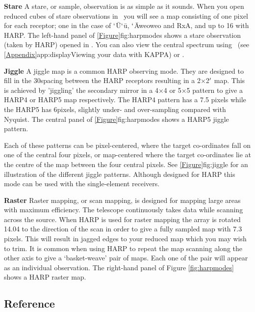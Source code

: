 \documentclass[11pt,oneside,chapters]{starlink}
\newcommand{\udeg}{\hspace{-0.3em}\dgs\hspace{-0.08em}}
\newcommand{\uarcs}{\hspace{-0.27em}\arcsec\hspace{-0.07em}}
\newcommand{\udeg}{\HCode{&deg}}
\newcommand{\uarcs}{$''$}
\begin{document}
\begin{aligndesc}
\item[\textbf{Stare}]
A stare, or sample, observation is as simple as it sounds. When you
open reduced cubes of stare observations in \gaia\ you will see a map
consisting of one pixel for each receptor; one in the case of
$`$\=U$`$\=u, $`$\=Aweoweo and RxA, and up to 16 with HARP.
The left-hand panel of \cref{Figure}{fig:harpmodes}{}
shows a stare observation (taken by HARP) opened in \gaia. You can also view the
central spectrum using \linplot\ (see \cref{Appendix}{app:display}{Viewing
your data with KAPPA}) or \splat.

\item[\textbf{Jiggle}]
A jiggle map is a common HARP observing mode. They are designed to
fill in the 30\arcsec spacing between the HARP receptors resulting in a
2\arcm$\times$2$\arcm$ map. This is achieved by 'jiggling' the secondary
mirror in a 4$\times$4 or 5$\times$5 pattern to give a HARP4 or HARP5
map respectively.  The HARP4 pattern has a 7.\uarcs5 pixels while the
HARP5 has 6\arcsec pixels, slightly under- and over-sampling compared
with Nyquist. The central panel of \cref{Figure}{fig:harpmodes}{} shows a
HARP5 jiggle pattern.

Each of these patterns can be pixel-centered, where the target
co-ordinates fall on one of the central four pixels, or map-centered where
the target co-ordinates lie at the centre of the map between the four
central pixels. See \cref{Figure}{fig:jiggle}{} for an illustration of the
different jiggle patterns. Although designed for HARP this mode can be
used with the single-element receivers.

\item[\textbf{Raster}]
Raster mapping, or scan mapping, is designed for mapping large areas
with maximum efficiency. The telescope continuously takes data while
scanning across the source. When HARP is used for raster mapping the
array is rotated 14.\udeg04 to the direction of the scan in order
to give a fully sampled map with 7.\uarcs3 pixels. This will result in
jagged edges to your reduced map which you may wish to trim. It is
common when using HARP to repeat the map scanning along the other axis
to give a `basket-weave' pair of maps. Each one of the pair will
appear as an individual observation.  The right-hand panel of Figure
\ref{fig:harpmodes} shows a HARP raster map.
\end{aligndesc}

\subsection{Reference}
\end{document}
